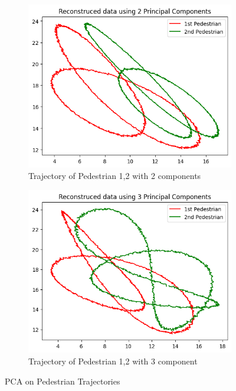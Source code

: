 \begin{itemize}
\begin{figure}[H]
    \centering
    \begin{subfigure}[b]{0.45\textwidth}
        \centering
        \includegraphics[width=\textwidth]{images/ex3task1-3-2.png}
        \caption{Trajectory of Pedestrian 1,2 with 2 components}
        \label{fig:Trajectory of Pedestrian 1,2 with 2 component3}
    \end{subfigure}
    \begin{subfigure}[b]{0.45\textwidth}
        \centering
        \includegraphics[width=\textwidth]{images/ex3task1-3-3.png}
        \caption{Trajectory of Pedestrian 1,2 with 3 component}
        \label{fig:Trajectory of Pedestrian 1,2 with 3 component}
    \end{subfigure}
    \caption{PCA on Pedestrian Trajectories}
    \label{fig:part3-2}
\end{figure}


\end{itemize}
